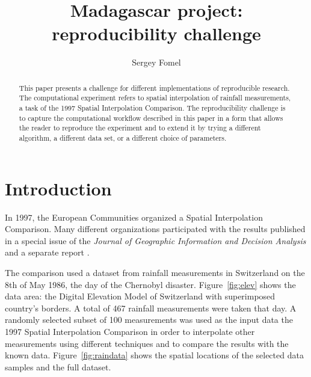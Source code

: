 \title{Madagascar project: reproducibility challenge}

\author{Sergey Fomel}


\address {
sergey.fomel@beg.utexas.edu \\
Jackson School of Geosciences \\
The University of Texas at Austin \\ 
University Station, Box X \\
Austin, TX 78713-8924 \\
USA}

\maketitle

\begin{abstract}
This paper presents a challenge for different implementations of
reproducible research. The computational experiment refers to spatial
interpolation of rainfall measurements, a task of the 1997 Spatial
Interpolation Comparison. The reproducibility challenge is to capture
the computational workflow described in this paper in a form that
allows the reader to reproduce the experiment and to extend it by
trying a different algorithm, a different data set, or a different
choice of parameters.
\end{abstract}

\section{Introduction}

In 1997, the European Communities organized a Spatial Interpolation
Comparison. Many different organizations participated with the results
published in a special issue of the \emph{Journal of Geographic
Information and Decision Analysis} \cite[]{dubois} and a separate
report \cite[]{rain}.


The comparison used a dataset from rainfall measurements in
Switzerland on the 8th of May 1986, the day of the Chernobyl disaster.
Figure~\ref{fig:elev} shows the data area: the Digital Elevation Model
of Switzerland with superimposed country's borders.  A total of 467
rainfall measurements were taken that day. A randomly selected subset
of 100 measurements was used as the input data the 1997 Spatial
Interpolation Comparison in order to interpolate other measurements
using different techniques and to compare the results with the known
data. Figure~\ref{fig:raindata} shows the spatial locations of the
selected data samples and the full dataset.

